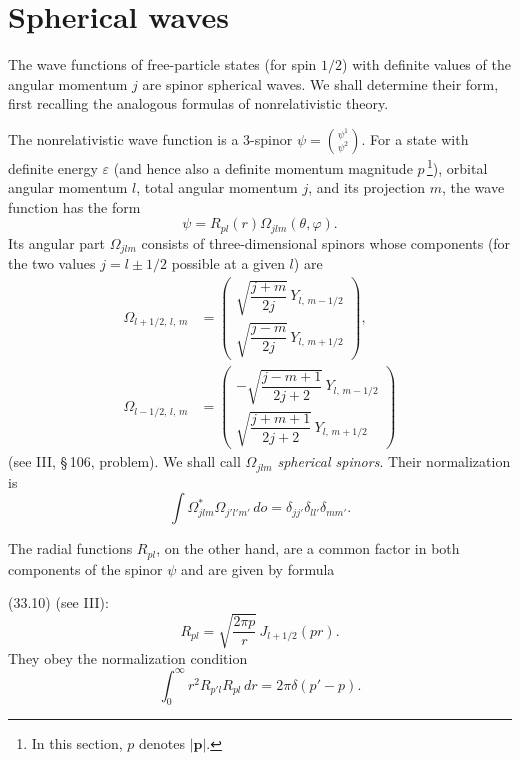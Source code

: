 \section{Spherical waves}

The wave functions of free-particle states (for spin $1/2$) with definite values of the angular momentum $j$ are spinor spherical waves. We shall determine their form, first recalling the analogous formulas of nonrelativistic theory.

The nonrelativistic wave function is a 3-spinor $\psi = \binom{\psi^1}{\psi^2}$. For a state with definite energy $\varepsilon$ (and hence also a definite momentum magnitude $p$\,\footnote{In this section, $p$ denotes $|\mathbf{p}|$.}), orbital angular momentum $l$, total angular momentum $j$, and its projection $m$, the wave function has the form
\begin{equation}
\psi = R_{pl}(r)\Omega_{jlm}(\theta, \varphi).
\tag{24.1}
\end{equation}
Its angular part $\Omega_{jlm}$ consists of three-dimensional spinors whose components (for the two values $j = l \pm 1/2$ possible at a given $l$) are
\begin{equation}
\begin{aligned}
\Omega_{l+1/2,\,l,\,m} &={}
\begin{pmatrix}
\sqrt{\dfrac{j+m}{2j}}\,Y_{l,\,m-1/2}\\[6pt]
\sqrt{\dfrac{j-m}{2j}}\,Y_{l,\,m+1/2}
\end{pmatrix},\\[6pt]
\Omega_{l-1/2,\,l,\,m} &={}
\begin{pmatrix}
-\sqrt{\dfrac{j-m+1}{2j+2}}\,Y_{l,\,m-1/2}\\[6pt]
\sqrt{\dfrac{j+m+1}{2j+2}}\,Y_{l,\,m+1/2}
\end{pmatrix}
\end{aligned}
\tag{24.2}
\end{equation}
(see III, \S\,106, problem). We shall call $\Omega_{jlm}$ \emph{spherical spinors}. Their normalization is
\begin{equation}
\int \Omega^*_{jlm}\Omega_{j'l'm'}\,do = \delta_{jj'}\delta_{ll'}\delta_{mm'}.
\tag{24.3}
\end{equation}

The radial functions $R_{pl}$, on the other hand, are a common factor in both components of the spinor $\psi$ and are given by formula

(33.10) (see III):
\begin{equation}
R_{pl} = \sqrt{\frac{2\pi p}{r}}\,J_{l+1/2}(pr).
\tag{24.4}
\end{equation}
They obey the normalization condition
\begin{equation}
\int_0^\infty r^2 R_{p'l}R_{pl}\,dr = 2\pi\delta(p' - p).
\tag{24.5}
\end{equation}

